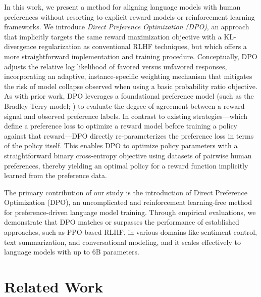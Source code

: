 In this work, we present a method for aligning language models with human preferences without resorting to explicit reward models or reinforcement learning frameworks. We introduce \textit{{Direct Preference Optimization} (DPO)}, an approach that implicitly targets the same reward maximization objective with a KL-divergence regularization as conventional RLHF techniques, but which offers a more straightforward implementation and training procedure. Conceptually, DPO adjusts the relative log likelihood of favored versus unfavored responses, incorporating an adaptive, instance-specific weighting mechanism that mitigates the risk of model collapse observed when using a basic probability ratio objective. As with prior work, DPO leverages a foundational preference model (such as the Bradley-Terry model; \cite{bradley1952rankanalysis}) to evaluate the degree of agreement between a reward signal and observed preference labels. In contrast to existing strategies—which define a preference loss to optimize a reward model before training a policy against that reward—DPO directly re-parameterizes the preference loss in terms of the policy itself. This enables DPO to optimize policy parameters with a straightforward binary cross-entropy objective using datasets of pairwise human preferences, thereby yielding an optimal policy for a reward function implicitly learned from the preference data.

The primary contribution of our study is the introduction of Direct Preference Optimization (DPO), an uncomplicated and reinforcement learning-free method for preference-driven language model training. Through empirical evaluations, we demonstrate that DPO matches or surpasses the performance of established approaches, such as PPO-based RLHF, in various domains like sentiment control, text summarization, and conversational modeling, and it scales effectively to language models with up to 6B parameters.

\section{Related Work}

